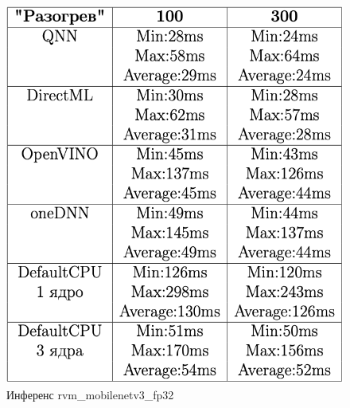 \documentclass[a4paper,14pt]{extreport}
\begin{document}
\begin{figure}[!h]
\begin{center}
\begin{minipage}[h]{0.4\linewidth}
                    \includegraphics[width=1\linewidth]{images-results/rvm.png}
                    \caption{Инференс rvm\_mobilenetv3\_fp32}
                    \label{ris:rvm}
                \end{minipage}
            \end{center}
        \end{figure}
        
\end{document}
